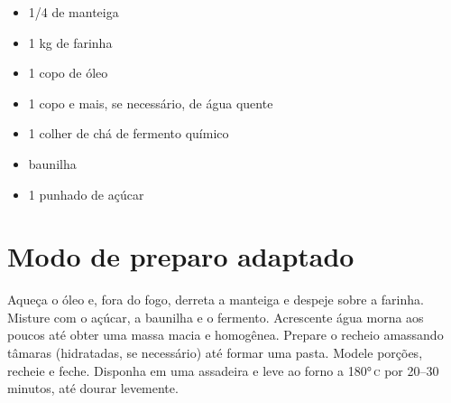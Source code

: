 \begin{itemize}
\item 1/4 de manteiga
\item 1 kg de farinha
\item 1 copo de óleo
\item 1 copo e mais, se necessário, de água quente
\item 1 colher de chá de fermento químico
\item baunilha
\item 1 punhado de açúcar
\end{itemize}

\section{Modo de preparo adaptado}

Aqueça o óleo e, fora do fogo, derreta a manteiga e despeje sobre a farinha. Misture com o açúcar, a baunilha e o fermento. Acrescente água morna aos poucos até obter uma massa macia e homogênea. Prepare o recheio amassando tâmaras (hidratadas, se necessário) até formar uma pasta. Modele porções, recheie e feche. Disponha em uma assadeira e leve ao forno a 180°\,\textsc{c} por 20--30 minutos, até dourar levemente.

